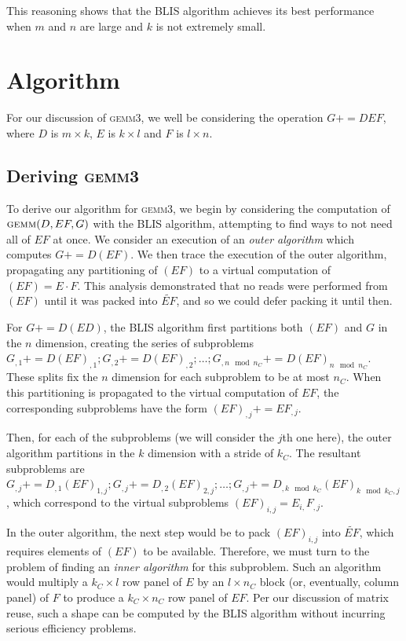 \documentclass[12pt]{article}
\newcommand*{\pluseq}{\mathrel{{+}{=}}}
\newcommand*{\gemmt}{{\textsc{gemm3}}}
\begin{document}
This reasoning shows that the BLIS algorithm achieves its best performance when $m$ and $n$ are large and $k$ is not extremely small.

\section{Algorithm}
For our discussion of \gemmt{}, we well be considering the operation $G \pluseq DEF$, where $D$ is $m \times k$, $E$ is $k \times l$ and $F$ is $l \times n$.

\subsection{Deriving \gemmt}
To derive our algorithm for \gemmt{}, we begin by considering the computation of $\textsc{gemm}(D, EF, G)$ with the BLIS algorithm, attempting to find ways to not need all of $EF$ at once.
We consider an execution of an \emph{outer algorithm} which computes $G \pluseq D(EF)$.
We then trace the execution of the outer algorithm, propagating any partitioning of $(EF)$ to a virtual computation of $(EF) = E \cdot F$.
This analysis demonstrated that no reads were performed from $(EF)$ until it was packed into $\widetilde{EF}$, and so we could defer packing it until then.

For $G \pluseq D(ED)$, the BLIS algorithm first partitions both $(EF)$ and $G$ in the $n$ dimension, creating the series of subproblems $G_{,1} \pluseq D(EF)_{,1}; G_{,2} \pluseq D(EF)_{,2}; \ldots; G_{,n \mod n_C} \pluseq D(EF)_{n \mod n_C}$.
These splits fix the $n$ dimension for each subproblem to be at most $n_C$.
When this partitioning is propagated to the virtual computation of $EF$, the corresponding subproblems have the form $(EF)_{,j} \pluseq EF_{,j}$.

Then, for each of the subproblems (we will consider the $j$th one here), the outer algorithm partitions in the $k$ dimension with a stride of $k_C$.
The resultant subproblems are $G_{,j} \pluseq D_{,1}(EF)_{1,j}; G_{,j} \pluseq D_{,2}(EF)_{2,j}; \ldots; G_{,j} \pluseq D_{,k \mod k_C}(EF)_{k \mod k_C,j}$, which correspond to the virtual subproblems $(EF)_{i,j} = E_{i,}F_{,j}$.

In the outer algorithm, the next step would be to pack $(EF)_{i,j}$ into $\widetilde{EF}$, which requires elements of $(EF)$ to be available.
Therefore, we must turn to the problem of finding an \emph{inner algorithm} for this subproblem.
Such an algorithm would multiply a  $k_C \times l$ row panel of $E$ by an $l \times n_C$ block (or, eventually, column panel) of $F$ to produce a $k_C \times n_C$ row panel of $EF$.
Per our discussion of matrix reuse, such a shape can be computed by the BLIS algorithm without incurring serious efficiency problems.
\end{document}
